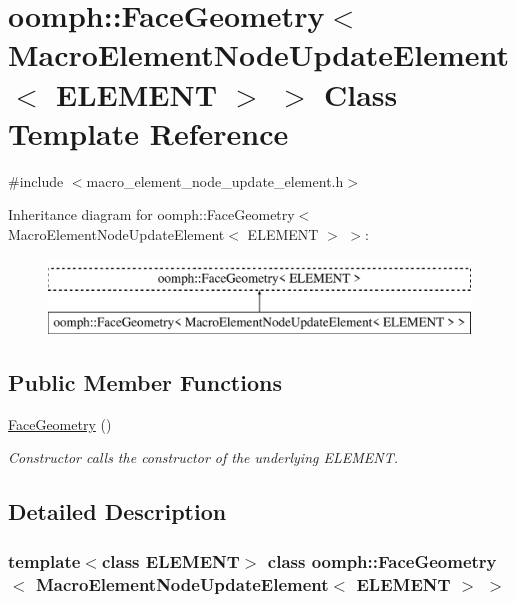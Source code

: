 \hypertarget{classoomph_1_1FaceGeometry_3_01MacroElementNodeUpdateElement_3_01ELEMENT_01_4_01_4}{}\section{oomph\+:\+:Face\+Geometry$<$ Macro\+Element\+Node\+Update\+Element$<$ E\+L\+E\+M\+E\+NT $>$ $>$ Class Template Reference}
\label{classoomph_1_1FaceGeometry_3_01MacroElementNodeUpdateElement_3_01ELEMENT_01_4_01_4}


{\ttfamily \#include $<$macro\+\_\+element\+\_\+node\+\_\+update\+\_\+element.\+h$>$}

Inheritance diagram for oomph\+:\+:Face\+Geometry$<$ Macro\+Element\+Node\+Update\+Element$<$ E\+L\+E\+M\+E\+NT $>$ $>$\+:\begin{figure}[H]
\begin{center}
\leavevmode
\includegraphics[height=2.000000cm]{classoomph_1_1FaceGeometry_3_01MacroElementNodeUpdateElement_3_01ELEMENT_01_4_01_4}
\end{center}
\end{figure}
\subsection*{Public Member Functions}
\begin{DoxyCompactItemize}
\item 
\hyperlink{classoomph_1_1FaceGeometry_3_01MacroElementNodeUpdateElement_3_01ELEMENT_01_4_01_4_ad3564b71b390c570eb97ae069f9b8def}{Face\+Geometry} ()
\begin{DoxyCompactList}\small\item\em Constructor calls the constructor of the underlying E\+L\+E\+M\+E\+NT. \end{DoxyCompactList}\end{DoxyCompactItemize}


\subsection{Detailed Description}
\subsubsection*{template$<$class E\+L\+E\+M\+E\+NT$>$\newline
class oomph\+::\+Face\+Geometry$<$ Macro\+Element\+Node\+Update\+Element$<$ E\+L\+E\+M\+E\+N\+T $>$ $>$}

